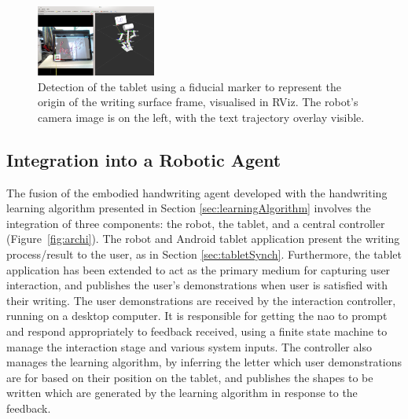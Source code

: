\documentclass{sig-alternate}
\begin{document}
\begin{figure}[htpb]
    \centering
    \includegraphics[width=0.35\textwidth]{figures/chilitagDetection_cameraOverlay.png}
    \caption{\label{fig:tabletDetection}Detection of the tablet using a fiducial
    marker to represent the origin of the writing surface frame, visualised in RViz. The robot's
    camera image is on the left, with the text trajectory overlay visible.}

\end{figure}


\subsection{Integration into a Robotic Agent}

The fusion of the embodied handwriting agent developed with the handwriting
learning algorithm presented in Section \ref{sec:learningAlgorithm} involves the
integration of three components: the robot, the tablet, and a central controller
(Figure~\ref{fig:archi}).  The robot and Android tablet application present the
writing process/result to the user, as in Section \ref{sec:tabletSynch}.
Furthermore, the tablet application has been extended to act as the primary medium for
capturing user interaction, and publishes the user's demonstrations when user is
satisfied with their writing. The user demonstrations are received by the
interaction controller, running on a desktop computer. It is responsible for
getting the {\sc nao} to prompt and respond appropriately to feedback received, using
a finite state machine to manage the interaction stage and various system
inputs. The controller also manages the learning algorithm, by inferring the letter which
user demonstrations are for based on their position on the tablet, and
publishes the shapes to be written which are generated by the learning algorithm
in response to the feedback.  


\end{document}
